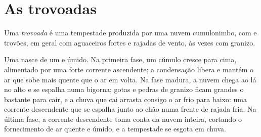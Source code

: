 \section{As trovoadas}

\begin{definition}[Trovoada]\label{def:g10:storms-and-cyclones:thunderstorm}
Uma \emph{trovoada} é uma tempestade produzida por uma nuvem
cumulonimbo, com  e trovões, em geral com aguaceiros fortes e rajadas
de vento, às vezes com granizo.
\end{definition}

Uma  nasce de um  e úmido. Na primeira fase, um cúmulo
cresce para cima, alimentado por uma forte corrente ascendente; a
condensação libera  e mantém o ar que sobe mais quente que o
ar em volta. Na fase madura, a nuvem chega ao  lá no alto e se
espalha numa bigorna; gotas e pedras de granizo ficam grandes o bastante
para cair, e a chuva que cai arrasta consigo o ar frio para baixo: uma
corrente descendente que se espalha junto ao chão numa frente de rajada
fria. Na última fase, a corrente descendente toma conta da nuvem inteira,
cortando o fornecimento de ar quente e úmido, e a tempestade se esgota em
chuva.

